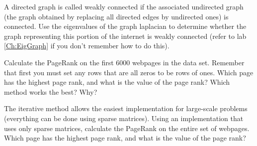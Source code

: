 \begin{problem}
\label{prob:pg_undirected}
A directed graph is called weakly connected if the associated undirected graph (the graph obtained by replacing all directed edges by undirected ones) is connected. Use the eigenvalues of the graph laplacian to determine whether the graph representing this portion of the internet is weakly connected (refer to lab \ref{Ch:EigGraph} if you don't remember how to do this).
\end{problem}

\begin{problem}
\label{prob:pg_calc}
Calculate the PageRank on the first 6000 webpages in the data set. Remember that first you must set any rows that are all zeros to be rows of ones. Which page has the highest page rank, and what is the value of the page rank? Which method works the best? Why?
\end{problem}

\begin{problem}
The iterative method allows the easiest implementation for large-scale problems (everything can be done using sparse matrices). Using an implementation that uses only sparse matrices, calculate the PageRank on the entire set of webpages. Which page has the highest page rank, and what is the value of the page rank?
\end{problem}

